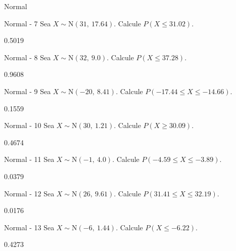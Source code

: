 \documentclass[a4,11pt]{aleph-notas}
\newcommand{\Norm}{\text{N}}
\begin{document}
\begin{quiz}{Normal}
\begin{numerical}[tolerance=0.001]%
    {Normal - 7}
    Sea \( X \sim \Norm(31,\ 17.64) \). Calcule \( P(X \leq 31.02) \).
    \item[] 0.5019
\end{numerical}

\begin{numerical}[tolerance=0.001]%
    {Normal - 8}
    Sea \( X \sim \Norm(32,\ 9.0) \). Calcule \( P(X \leq 37.28) \).
    \item[] 0.9608
\end{numerical}

\begin{numerical}[tolerance=0.001]%
    {Normal - 9}
    Sea \( X \sim \Norm(-20,\ 8.41) \). Calcule \( P(-17.44 \leq X \leq -14.66) \).
    \item[] 0.1559
\end{numerical}

\begin{numerical}[tolerance=0.001]%
    {Normal - 10}
    Sea \( X \sim \Norm(30,\ 1.21) \). Calcule \( P(X \geq 30.09) \).
    \item[] 0.4674
\end{numerical}

\begin{numerical}[tolerance=0.001]%
    {Normal - 11}
    Sea \( X \sim \Norm(-1,\ 4.0) \). Calcule \( P(-4.59 \leq X \leq -3.89) \).
    \item[] 0.0379
\end{numerical}

\begin{numerical}[tolerance=0.001]%
    {Normal - 12}
    Sea \( X \sim \Norm(26,\ 9.61) \). Calcule \( P(31.41 \leq X \leq 32.19) \).
    \item[] 0.0176
\end{numerical}

\begin{numerical}[tolerance=0.001]%
    {Normal - 13}
    Sea \( X \sim \Norm(-6,\ 1.44) \). Calcule \( P(X \leq -6.22) \).
    \item[] 0.4273
\end{numerical}


\end{quiz}
\end{document}
